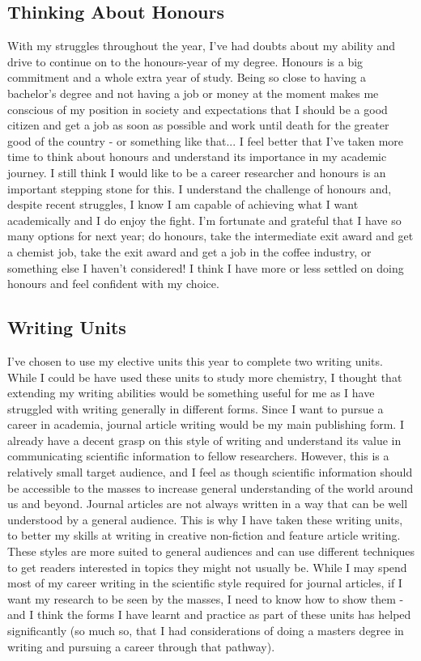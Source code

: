 \documentclass[11pt]{article}
\begin{document}
\subsection{Thinking About Honours}

With my struggles throughout the year, I've had doubts about my ability and drive to continue on to the honours-year of my degree. Honours is a big commitment and a whole extra year of study. Being so close to having a bachelor's degree and not having a job or money at the moment makes me conscious of my position in society and expectations that I should be a good citizen and get a job as soon as possible and work until death for the greater good of the country - or something like that... I feel better that I've taken more time to think about honours and understand its importance in my academic journey. I still think I would like to be a career researcher and honours is an important stepping stone for this. I understand the challenge of honours and, despite recent struggles, I know I am capable of achieving what I want academically and I do enjoy the fight. I'm fortunate and grateful that I have so many options for next year; do honours, take the intermediate exit award and get a chemist job, take the exit award and get a job in the coffee industry, or something else I haven't considered! I think I have more or less settled on doing honours and feel confident with my choice.

\subsection{Writing Units}

I've chosen to use my elective units this year to complete two writing units. While I could be have used these units to study more chemistry, I thought that extending my writing abilities would be something useful for me as I have struggled with writing generally in different forms. Since I want to pursue a career in academia, journal article writing would be my main publishing form. I already have a decent grasp on this style of writing and understand its value in communicating scientific information to fellow researchers. However, this is a relatively small target audience, and I feel as though scientific information should be accessible to the masses to increase general understanding of the world around us and beyond. Journal articles are not always written in a way that can be well understood by a general audience. This is why I have taken these writing units, to better my skills at writing in creative non-fiction and feature article writing. These styles are more suited to general audiences and can use different techniques to get readers interested in topics they might not usually be. While I may spend most of my career writing in the scientific style required for journal articles, if I want my research to be seen by the masses, I need to know how to show them - and I think the forms I have learnt and practice as part of these units has helped significantly (so much so, that I had considerations of doing a masters degree in writing and pursuing a career through that pathway).
\end{document}
